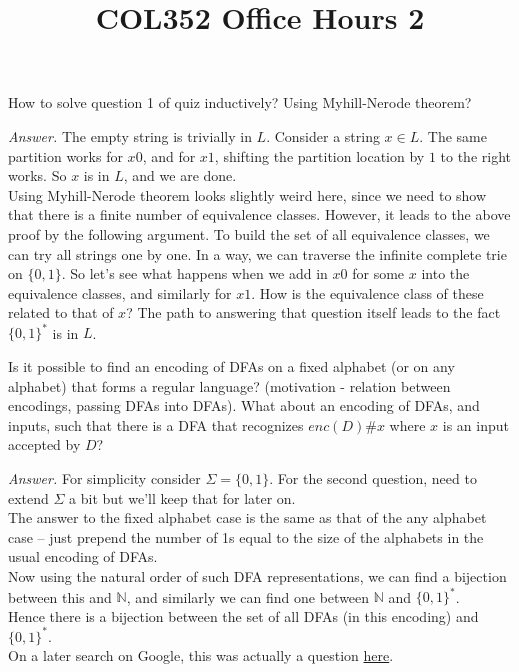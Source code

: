 \documentclass[a4paper]{article}
\title{\textbf{COL352 Office Hours 2}}
\date{}
\newenvironment{ans}{\begin{breakbox}\textit{Answer.}}{\end{breakbox}}
\newcommand{\nl}{\vspace{0.2cm}\\}
\newcommand{\mb}{\mathbb}
\begin{document}
\maketitle

\begin{ques}
    How to solve question 1 of quiz inductively? Using Myhill-Nerode theorem?
\end{ques}

\begin{ans}
    The empty string is trivially in $L$. Consider a string $x \in L$. The same partition works for $x0$, and for $x1$, shifting the partition location by $1$ to the right works. So $x$ is in $L$, and
    we are done.\nl
    Using Myhill-Nerode theorem looks slightly weird here, since we need to show that there is a finite number of equivalence classes. However, it leads to the above proof by the following argument.
    To build the set of all equivalence classes, we can try all strings one by one. In a way, we can traverse the infinite complete trie on $\{0, 1\}$. So let's see what happens when we add in $x0$
    for some $x$ into the equivalence classes, and similarly for $x1$. How is the equivalence class of these related to that of $x$? The path to answering that question itself leads to the fact
    $\{0, 1\}^*$ is in $L$.
\end{ans}

\begin{ques}
    Is it possible to find an encoding of DFAs on a fixed alphabet (or on any alphabet) that forms a regular language? (motivation - relation between encodings, passing DFAs into DFAs). What about an encoding of DFAs, and inputs, such that
    there is a DFA that recognizes $enc(D)\#x$ where $x$ is an input accepted by $D$? 
\end{ques}

\begin{ans}
    For simplicity consider $\Sigma = \{0, 1\}$. For the second question, need to extend $\Sigma$ a bit but we'll keep that for later on.\nl
    The answer to the fixed alphabet case is the same as that of the any alphabet case -- just prepend the number of 1s equal to the size of the alphabets in the usual encoding of DFAs.\nl
    Now using the natural order of such DFA representations, we can find a bijection between this and $\mb{N}$, and similarly we can find one between $\mb{N}$ and $\{0, 1\}^*$.\nl
    Hence there is a bijection between the set of all DFAs (in this encoding) and $\{0, 1\}^*$.\nl
    On a later search on Google, this was actually a question
    \href{https://cs.stackexchange.com/questions/2682/is-the-set-of-codes-of-deterministic-finite-state-automata-a-regular-language}{here}.
\end{ans}
\end{document}
